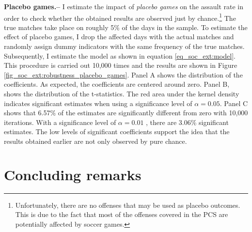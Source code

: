 \documentclass[11pt, a4paper]{article} %
\begin{document}
 
\textbf{Placebo games.--} I estimate the impact of \textit{placebo games} on the assault rate in order to check whether the obtained results are observed just by chance.\footnote{Unfortunately, there are no offenses that may be used as placebo outcomes. This is due to the fact that most of the offenses covered in the PCS are potentially affected by soccer games.} The true matches take place on roughly 5\% of the days in the sample. To estimate the effect of placebo games, I drop the affected days with the actual matches and randomly assign dummy indicators with the same frequency of the true matches. Subsequently, I estimate the model as shown in equation \ref{eq_soc_ext:model}. This procedure is carried out 10,000 times and the results are shown in Figure \ref{fig_soc_ext:robustness_placebo_games}. Panel A shows the distribution of the coefficients. As expected, the coefficients are centered around zero. Panel B, shows the distribution of the t-statistics. The red area under the kernel density indicates significant estimates when using a significance level of $\alpha=0.05$. Panel C shows that 6.57\% of the estimates are significantly different from zero with 10,000 iterations. With a significance level of $\alpha=0.01$ , there are 3.06\% significant estimates. The low levels of significant coefficients support the idea that the results obtained earlier are not only observed by pure chance. 













\bigskip
\section{Concluding remarks}\label{sec_soc_ext:conclusion}
\end{document}
